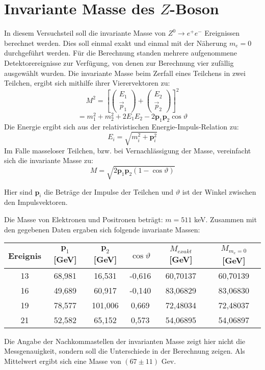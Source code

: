 \section{Invariante Masse des $Z$-Boson}

In diesem Versuchsteil soll die invariante Masse von $Z^0 \rightarrow e^+ e^-$ Ereignissen berechnet werden.
Dies soll einmal exakt und einmal mit der Näherung $m_e = 0$ durchgeführt werden.
Für die Berechnung standen mehrere aufgenommene Detektorereignisse zur Verfügung, von denen zur Berechnung vier zufällig ausgewählt wurden.
Die invariante Masse beim Zerfall eines Teilchens in zwei Teilchen, ergibt sich mithilfe ihrer Vierervektoren zu:
\[
M^2 =\left[ \left( \begin{array}{c} E_1 \\ {\vec{p}_1} \end{array} \right) + \left( \begin{array}{c} E_2 \\ {\vec{p}_2} \end{array} \right) \right]^2
\]
\[
= m_1^2 + m_2^2 + 2 E_1 E_2 - 2 \textbf{p}_1 \textbf{p}_2 \cos \vartheta
\]
Die Energie ergibt sich aus der relativistischen Energie-Impuls-Relation zu:
\[
E_i = \sqrt{m_i^2 + \textbf{p}_i^2}
\]
Im Falle masseloser Teilchen, bzw. bei Vernachlässigung der Masse, vereinfacht sich die invariante Masse zu:
\[
M = \sqrt{2 \textbf{p}_1 \textbf{p}_2 (1-\cos \vartheta)}
\]

Hier sind $ \textbf{p}_i$ die Beträge der Impulse der Teilchen und $\vartheta$ ist der Winkel zwischen den Impulsvektoren.

Die Masse von Elektronen und Positronen beträgt: $m=511$ keV.
Zusammen mit den gegebenen Daten ergaben sich folgende invariante Massen:
\begin{center}
\begin{tabular}{ c | c| c | c | c | c }
Ereignis & $ \textbf{p}_1$ [GeV] & $ \textbf{p}_2$ [GeV] & $ \cos \vartheta $ & $M_{exakt}$ [GeV] &$ M_{m_e = 0}$ [GeV] \\ 
\hline
13 & 68,981 & 16,531 & -0,616 & 60,70137 & 60,70139 \\ 
16 & 49,689 & 60,917 & -0,140 & 83,06829 & 83,06830 \\
19 & 78,577 & 101,006 & 0,669 &72,48034 & 72,48037 \\
21 & 52,582 & 65,152 & 0,573 & 54,06895 & 54,06897 \\
\end{tabular}
\end{center}
Die Angabe der Nachkommastellen der invarianten Masse zeigt hier nicht die Messgenauigkeit, sondern soll die Unterschiede in der Berechnung zeigen.
Als Mittelwert ergibt sich eine Masse von $(67 \pm 11)$ Gev.


